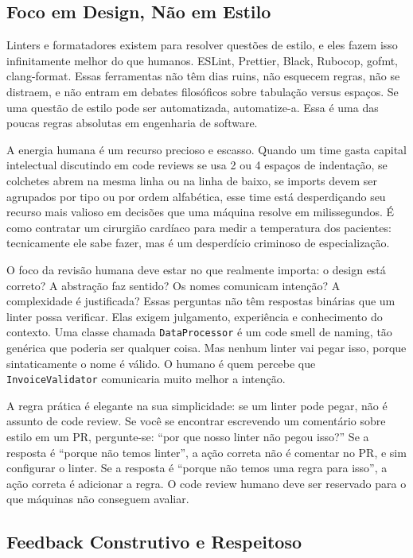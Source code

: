 \subsection{Foco em Design, Não em Estilo}

Linters e formatadores existem para resolver questões de estilo, e eles fazem isso
infinitamente melhor do que humanos. ESLint, Prettier, Black, Rubocop, gofmt,
clang-format. Essas ferramentas não têm dias ruins, não esquecem regras, não se
distraem, e não entram em debates filosóficos sobre tabulação versus espaços. Se uma
questão de estilo pode ser automatizada, automatize-a. Essa é uma das poucas regras
absolutas em engenharia de software.

A energia humana é um recurso precioso e escasso. Quando um time gasta capital
intelectual discutindo em code reviews se usa 2 ou 4 espaços de indentação, se
colchetes abrem na mesma linha ou na linha de baixo, se imports devem ser agrupados
por tipo ou por ordem alfabética, esse time está desperdiçando seu recurso mais
valioso em decisões que uma máquina resolve em milissegundos. É como contratar um
cirurgião cardíaco para medir a temperatura dos pacientes: tecnicamente ele sabe
fazer, mas é um desperdício criminoso de especialização.

O foco da revisão humana deve estar no que realmente importa: o design está correto?
A abstração faz sentido? Os nomes comunicam intenção? A complexidade é justificada?
Essas perguntas não têm respostas binárias que um linter possa verificar. Elas exigem
julgamento, experiência e conhecimento do contexto. Uma classe chamada
\texttt{DataProcessor} é um code smell de naming, tão genérica que poderia ser
qualquer coisa. Mas nenhum linter vai pegar isso, porque sintaticamente o nome é
válido. O humano é quem percebe que \texttt{InvoiceValidator} comunicaria muito
melhor a intenção.

A regra prática é elegante na sua simplicidade: se um linter pode pegar, não é assunto
de code review. Se você se encontrar escrevendo um comentário sobre estilo em um PR,
pergunte-se: ``por que nosso linter não pegou isso?'' Se a resposta é ``porque não
temos linter'', a ação correta não é comentar no PR, e sim configurar o linter. Se a
resposta é ``porque não temos uma regra para isso'', a ação correta é adicionar a
regra. O code review humano deve ser reservado para o que máquinas não conseguem
avaliar.

\subsection{Feedback Construtivo e Respeitoso}

